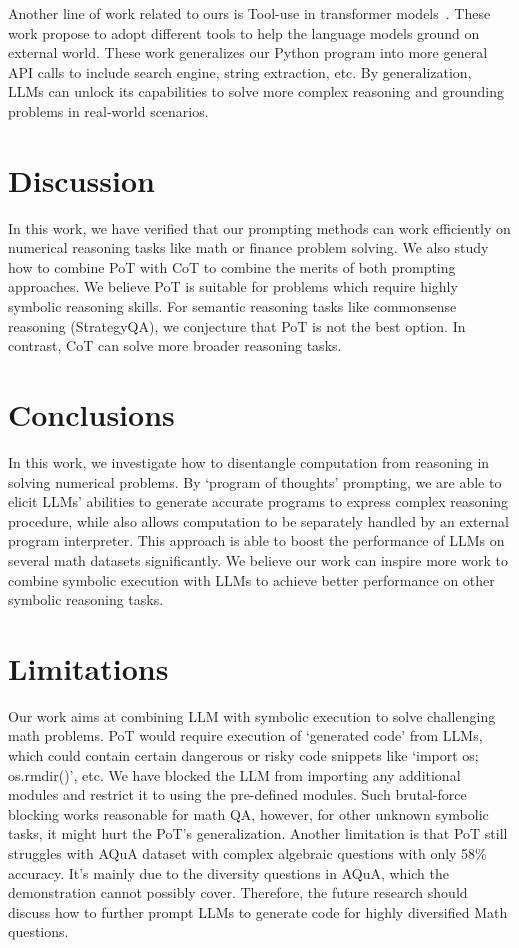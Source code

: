 Another line of work related to ours is Tool-use in transformer models~\citep{schick2023toolformer,paranjape2023art}. These work propose to adopt different tools to help the language models ground on external world. These work generalizes our Python program into more general API calls to include search engine, string extraction, etc. By generalization, LLMs can unlock its capabilities to solve more complex reasoning and grounding problems in real-world scenarios.   

\section{Discussion}

In this work, we have verified that our prompting methods can work efficiently on numerical reasoning tasks like math or finance problem solving. We also study how to combine PoT with CoT to combine the merits of both prompting approaches. We believe PoT is suitable for problems which require highly symbolic reasoning skills. For semantic reasoning tasks like commonsense reasoning (StrategyQA), we conjecture that PoT is not the best option. In contrast, CoT can solve more broader reasoning tasks.   

\section{Conclusions}

In this work, we investigate how to disentangle computation from reasoning in solving numerical problems. By `program of thoughts' prompting, we are able to elicit LLMs' abilities to generate accurate programs to express complex reasoning procedure, while also allows computation to be separately handled by an external program interpreter. This approach is able to boost the performance of LLMs on several math datasets significantly. We believe our work can inspire more work to combine symbolic execution with LLMs to achieve better performance on other symbolic reasoning tasks. 

\section*{Limitations}

Our work aims at combining LLM with symbolic execution to solve challenging math problems. PoT would require execution of `generated code' from LLMs, which could contain certain dangerous or risky code snippets like `import os; os.rmdir()', etc. We have blocked the LLM from importing any additional modules and restrict it to using the pre-defined modules. Such brutal-force blocking works reasonable for math QA, however, for other unknown symbolic tasks, it might hurt the PoT's generalization. Another limitation is that PoT still struggles with AQuA dataset with complex algebraic questions with only 58\% accuracy. It's mainly due to the diversity questions in AQuA, which the demonstration cannot possibly cover. Therefore, the future research should discuss how to further prompt LLMs to generate code for highly diversified Math questions. 


